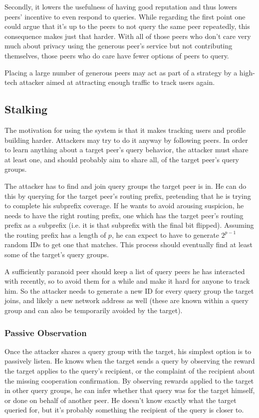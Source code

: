 Secondly, it lowers the usefulness of having good reputation and thus lowers
peers' incentive to even respond to queries. While regarding the first point one
could argue that it's up to the peers to not query the same peer repeatedly,
this consequence makes just that harder. With all of those peers who don't care
very much about privacy using the generous peer's service but not contributing
themselves, those peers who do care have fewer options of peers to query.

Placing a large number of generous peers may act as part of a strategy by a
high-tech attacker aimed at attracting enough traffic to track users again.

\subsection{Stalking}
\label{sec:desc_stalking}
The motivation for using the system is that it makes tracking users and profile
building harder. Attackers may try to do it anyway by following peers. In order
to learn anything about a target peer's query behavior, the attacker must share
at least one, and should probably aim to share all, of the target peer's query
groups.

The attacker has to find and join query groups the target peer is in. He can do
this by querying for the target peer's routing prefix, pretending that he is
trying to complete his subprefix coverage. If he wants to avoid arousing
suspicion, he needs to have the right routing prefix, one which has the target
peer's routing prefix as a subprefix (i.e. it is that subprefix with the final
bit flipped). Assuming the routing prefix has a length of $p$, he can expect to
have to generate $2^{p-1}$ random IDs to get one that matches. This process
should eventually find at least some of the target's query groups.

A sufficiently paranoid peer should keep a list of query peers he has interacted
with recently, so to avoid them for a while and make it hard for anyone to track
him. So the attacker needs to generate a new ID for every query group the target
joins, and likely a new network address as well (these are known within a query
group and can also be temporarily avoided by the target).

\subsubsection{Passive Observation}
Once the attacker shares a query group with the target, his simplest option is
to passively listen. He knows when the target sends a query by observing the
reward the target applies to the query's recipient, or the complaint of the
recipient about the missing cooperation confirmation. By observing rewards
applied to the target in other query groups, he can infer whether that query was
for the target himself, or done on behalf of another peer. He doesn't know
exactly what the target queried for, but it's probably something the recipient
of the query is closer to.

